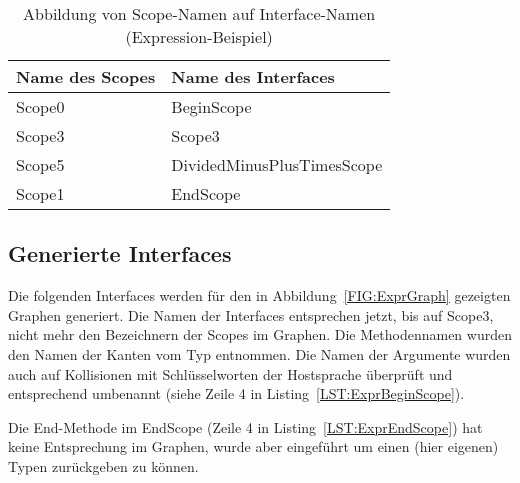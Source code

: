 \documentclass[../InterneDSLs.tex]{subfiles}
\begin{document}
\begin{table}[ht]
\centering
\begin{tabular}{ll}
\textbf{Name des Scopes} & \textbf{Name des Interfaces}\\\hline
Scope0 & BeginScope\\
Scope3 & Scope3\\
Scope5 & DividedMinusPlusTimesScope\\
Scope1 & EndScope\\
\end{tabular}
\caption[Abbildung von Scope- auf Interfacenamen (Expression-Beispiel)]{Abbildung von Scope-Namen auf Interface-Namen (Expression-Beispiel)}
\label{TAB:MappingExpressionScopeToInterface}
\end{table}

\subsection{Generierte Interfaces}
Die folgenden Interfaces werden für den in Abbildung~\ref{FIG:ExprGraph} gezeigten Graphen generiert. Die Namen der Interfaces entsprechen jetzt, bis auf Scope3, nicht mehr den Bezeichnern der Scopes im Graphen. Die Methodennamen wurden den Namen der Kanten vom Typ  entnommen. Die Namen der Argumente wurden auch auf Kollisionen mit Schlüsselworten der Hostsprache überprüft und entsprechend umbenannt (siehe Zeile 4 in Listing~\ref{LST:ExprBeginScope}).
\begin{figure}[ht]
    
\end{figure}

\begin{figure}[ht]
    
\end{figure}

\begin{figure}[ht]
    
\end{figure}

Die End-Methode im EndScope (Zeile 4 in Listing~\ref{LST:ExprEndScope}) hat keine Entsprechung im Graphen, wurde aber eingeführt um einen (hier eigenen) Typen zurückgeben zu können.
\begin{figure}[ht]
    
\end{figure}
\end{document}
